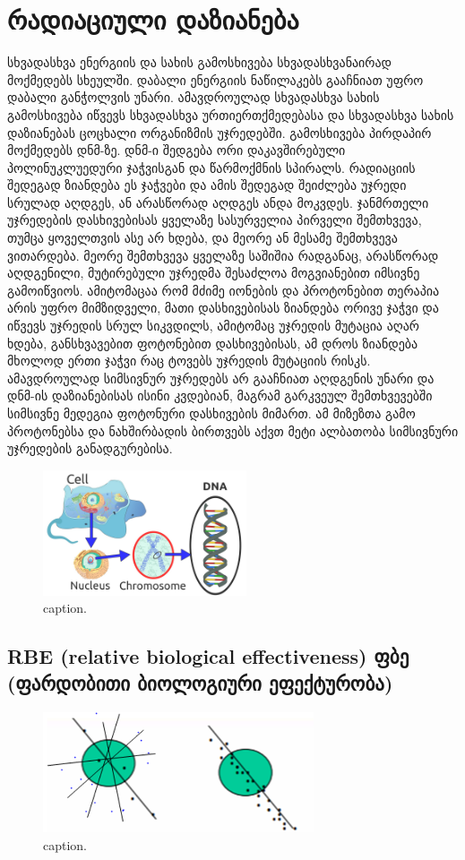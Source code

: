 \documentclass[12pt,a4paper,]{report}
\begin{document}
\section{რადიაციული დაზიანება}
სხვადასხვა ენერგიის და სახის გამოსხივება სხვადასხვანაირად მოქმედებს სხეულში. დაბალი ენერგიის ნაწილაკებს გააჩნიათ უფრო დაბალი განჭოლვის უნარი. ამავდროულად სხვადასხვა სახის გამოსხივება იწვევს სხვადასხვა ურთიერთქმედებასა და  სხვადასხვა სახის დაზიანებას ცოცხალი ორგანიზმის უჯრედებში. გამოსხივება პირდაპირ მოქმედებს დნმ-ზე. დნმ-ი შედგება ორი დაკავშირებული პოლინუკლუედური ჯაჭვისგან და წარმოქმნის სპირალს. რადიაციის შედეგად ზიანდება ეს ჯაჭვები და ამის შედეგად შეიძლება უჯრედი სრულად აღდგეს, ან არასწორად აღდგეს ანდა მოკვდეს. ჯანმრთელი უჯრედების დასხივებისას ყველაზე სასურველია პირველი შემთხვევა, თუმცა ყოველთვის ასე არ ხდება, და მეორე ან მესამე შემთხვევა ვითარდება. მეორე შემთხვევა ყველაზე საშიშია რადგანაც, არასწორად აღდგენილი, მუტირებული უჯრედმა შესაძლოა მოგვიანებით იმსივნე გამოიწვიოს. ამიტომაცაა რომ მძიმე იონების და პროტონებით თერაპია არის უფრო მიმზიდველი, მათი დასხივებისას ზიანდება ორივე ჯაჭვი და იწვევს უჯრედის სრულ სიკვდილს, ამიტომაც უჯრედის მუტაცია აღარ ხდება, განსხვავებით ფოტონებით დასხივებისას, ამ დროს ზიანდება მხოლოდ ერთი ჯაჭვი რაც ტოვებს უჯრედის მუტაციის რისკს. ამავდროულად სიმსივნურ უჯრედებს არ გააჩნიათ აღდგენის უნარი და დნმ-ის დაზიანებისას ისინი კვდებიან, მაგრამ გარკვეულ შემთხვევებში სიმსივნე მედეგია ფოტონური დასხივების მიმართ. ამ მიზეზთა გამო პროტონებსა და ნახშირბადის ბირთვებს აქვთ მეტი ალბათობა სიმსივნური უჯრედების განადგურებისა.

	\begin{figure}[htp]
	    \centering
        \includegraphics[width = 6cm]{images/Radiotherapy.jpg}
        \caption{caption.}
        \label{fig:1}
    \end{figure}

    \subsection{RBE (relative biological effectiveness)
 ფბე (ფარდობითი ბიოლოგიური ეფექტურობა) } 

	\begin{figure}[htp]
	    \centering
        \includegraphics[width = 8cm]{images/Picture1.png}
        \caption{caption.}
        \label{fig:1}
    \end{figure}
\end{document}
